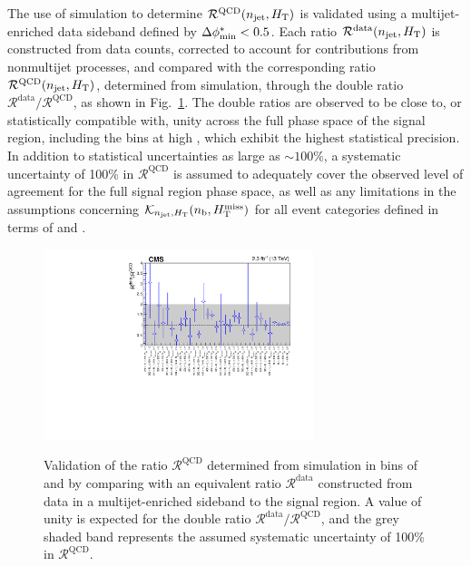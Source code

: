 The use of simulation to determine $\mathcal{R}^\text{QCD}(n_{\text{jet}},
H_{\mathrm{T}})$ is validated using a multijet-enriched data sideband defined
by $\mbox{$\Delta\phi^{*}_{\rm min}$} < 0.5$.
Each ratio $\mathcal{R}^\text{data}(n_{\text{jet}}, H_{\mathrm{T}})$ is constructed
from data counts, corrected to account for contributions from
nonmultijet processes, and compared with the corresponding ratio
$\mathcal{R}^\text{QCD}(n_{\text{jet}}, H_{\mathrm{T}})$, determined from simulation,
through the double ratio
$\mathcal{R}^\text{data}/\mathcal{R}^\text{QCD}$, as shown in
Fig.~\ref{fig:qcd}. The double ratios are observed to be close to, or
statistically compatible with, unity across the full phase space of
the signal region, including the bins at high \scalht, which exhibit
the highest statistical precision. In addition to statistical
uncertainties as large as $\sim 100\%$, a systematic uncertainty of
100\% in $\mathcal{R}^\text{QCD}$ is assumed to adequately cover the
observed level of agreement for the full signal region phase space, as
well as any limitations in the assumptions concerning
$\mathcal{K}_{n_{\text{jet}}, H_{\mathrm{T}}}(n_{\text{b}}, H_{\text{T}}^{\text{miss}})$ for all event categories
defined in terms of \njet and \scalht.

\begin{figure}[!t]
  \begin{center}
    \includegraphics[width=0.7\textwidth]{figures/qcd/v1/DoubleRatioQCD_noEmpty} \\
  \end{center}
  \caption{Validation of the ratio $\mathcal{R}^\text{QCD}$ determined
    from simulation in bins of \njet and \scalht by comparing with an
    equivalent ratio $\mathcal{R}^\text{data}$ constructed from data 
    in a multijet-enriched sideband to the signal region. A value of
    unity is expected for the double ratio $\mathcal{R}^\text{data} /
    \mathcal{R}^\text{QCD}$, and the grey shaded band represents the
    assumed systematic uncertainty of 100\% in
    $\mathcal{R}^\text{QCD}$. 
  }
  \label{fig:qcd} 
\end{figure}

